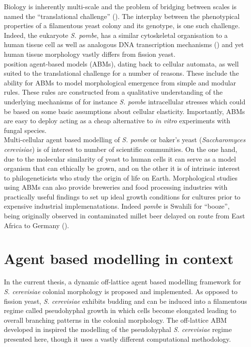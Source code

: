 Biology is inherently multi-scale and the problem 
of bridging between scales is named the ``translational challenge'' (\cite{an2009agent}).
The interplay between the phenotypical properties of a filamentous yeast colony and 
its genotype, is one such challenge. Indeed, the eukaryote \textit{S. pombe}, has a similar 
cytoskeletal organisation to a human tissue cell as well as analogous DNA transcription mechanisms 
(\cite{hoffman2015ancient}) and yet human tissue 
morphology vastly differs from fission yeast.
\\

\cite{an2009agent} position agent-based models (ABMs), dating back to cellular automata, as well suited to the 
 translational challenge for a number of reasons. These include the ability 
 for ABMs to model morphological emergence from simple and modular rules. These rules 
 are constructed from a qualitative understanding of the underlying mechanisms of for instance 
 \textit{S. pombe} intracellular stresses which could be based on some basic assumptions
 about cellular elasticity. Importantly, ABMs are easy to deploy acting 
 as a cheap alternative to \textit{in vitro} experiments with fungal species.
 \\

 Multi-cellular agent based modelling of \textit{S. pombe} or baker's yeast 
 (\textit{Saccharomyces cerevisiae}) is of interest to number of scientific  
 communities. On the one hand, due to the molecular similarity of yeast to human 
 cells it can serve as a model organism that can ethically be grown, and on 
 the other it is of intrinsic interest to philogeneticists who study the origin 
 of life on Earth. Morphological studies using ABMs can also provide breweries and 
 food processing industries with practically useful findings to 
 set up ideal growth conditions for cultures prior to expensive 
 industrial implemenatations. Indeed \textit{pombe} is Swahili 
 for ``booze'', being originally observed in contaminated 
 millet beer delayed on route from East Africa to Germany (\cite{hayles2018introduction}).
 \\

 \section{Agent based modelling in context}

 In the current thesis, a dynamic off-lattice agent based modelling framework for \textit{S. cerevisiae} 
 colonial morphology 
 is proposed and implemented. As opposed to fission yeast, \textit{S. cerevisiae} exhibits 
 budding and can be induced into a filamentous regime called pseudohyphal growth
 in which cells become elongated leading to overall branching patterns 
 in the colonial morphology. The off-lattice ABM developed in \cite{li2024off} 
 inspired the modelling of the pseudohyphal \textit{S. cerevisiae} regime 
 presented here, though it uses a vastly different computational methodology.
 \\

